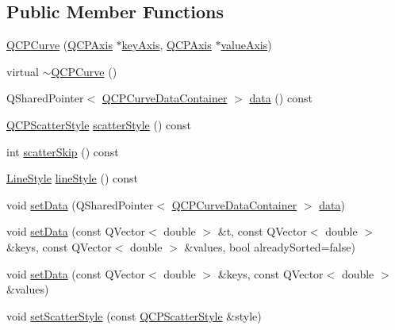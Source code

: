 \subsection*{Public Member Functions}
\begin{DoxyCompactItemize}
\item 
\hyperlink{class_q_c_p_curve_a36de58e2652b3fa47bdf9187d421d3ce}{Q\+C\+P\+Curve} (\hyperlink{class_q_c_p_axis}{Q\+C\+P\+Axis} $\ast$\hyperlink{class_q_c_p_abstract_plottable_a2cdd6f0dd5e9a979037f86b4000d9cfe}{key\+Axis}, \hyperlink{class_q_c_p_axis}{Q\+C\+P\+Axis} $\ast$\hyperlink{class_q_c_p_abstract_plottable_af47809a644a68ffd955fb30b01fb4f2f}{value\+Axis})
\item 
virtual \hyperlink{class_q_c_p_curve_a99ee5136754884a220cc0bcacfe419a3}{$\sim$\+Q\+C\+P\+Curve} ()
\item 
Q\+Shared\+Pointer$<$ \hyperlink{qcustomplot_8h_aaeee80d5664ea91beb9d7968790d0e65}{Q\+C\+P\+Curve\+Data\+Container} $>$ \hyperlink{class_q_c_p_curve_a761492fd00b1ab7cb18ce23c118c6c60}{data} () const
\item 
\hyperlink{class_q_c_p_scatter_style}{Q\+C\+P\+Scatter\+Style} \hyperlink{class_q_c_p_curve_afa6bd72a3a331a5ed45d3e0c5843b592}{scatter\+Style} () const
\item 
int \hyperlink{class_q_c_p_curve_a09b33217172aedf6c62c441b4ff66166}{scatter\+Skip} () const
\item 
\hyperlink{class_q_c_p_curve_a2710e9f79302152cff794c6e16cc01f1}{Line\+Style} \hyperlink{class_q_c_p_curve_a06e3cf3f8f1add689254b3cda66e040e}{line\+Style} () const
\item 
void \hyperlink{class_q_c_p_curve_a41246850d2e080bc57183ca19cd4135e}{set\+Data} (Q\+Shared\+Pointer$<$ \hyperlink{qcustomplot_8h_aaeee80d5664ea91beb9d7968790d0e65}{Q\+C\+P\+Curve\+Data\+Container} $>$ \hyperlink{class_q_c_p_curve_a761492fd00b1ab7cb18ce23c118c6c60}{data})
\item 
void \hyperlink{class_q_c_p_curve_a0768af2c33c8dcffa3cf5bdeb53923a6}{set\+Data} (const Q\+Vector$<$ double $>$ \&t, const Q\+Vector$<$ double $>$ \&keys, const Q\+Vector$<$ double $>$ \&values, bool already\+Sorted=false)
\item 
void \hyperlink{class_q_c_p_curve_a9d3245d43304226e013240c94802f7f6}{set\+Data} (const Q\+Vector$<$ double $>$ \&keys, const Q\+Vector$<$ double $>$ \&values)
\item 
void \hyperlink{class_q_c_p_curve_a55e43b44709bf50a35500644988aa706}{set\+Scatter\+Style} (const \hyperlink{class_q_c_p_scatter_style}{Q\+C\+P\+Scatter\+Style} \&style)

\end{DoxyCompactItemize}
